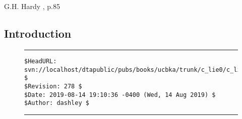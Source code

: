 
\chapter{\cliezerolongtitle{}}

\label{clie0}

                   {G.H. Hardy \cite{bibref:b:mathematiciansapology:1940},
                   p.85}

\section{Introduction}



\noindent\begin{figure}[!b]
\noindent\rule[-0.25in]{\textwidth}{1pt}
\begin{tiny}
\begin{verbatim}
$HeadURL: svn://localhost/dtapublic/pubs/books/ucbka/trunk/c_lie0/c_lie0.tex $
$Revision: 278 $
$Date: 2019-08-14 19:10:36 -0400 (Wed, 14 Aug 2019) $
$Author: dashley $
\end{verbatim}
\end{tiny}
\noindent\rule[0.25in]{\textwidth}{1pt}
\end{figure}
%
